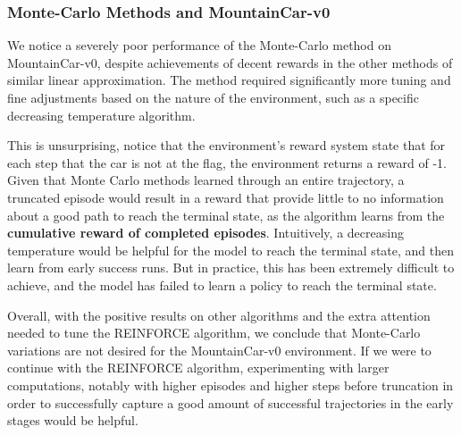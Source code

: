 \documentclass{article}
\begin{document}
\subsubsection{Monte-Carlo Methods and MountainCar-v0}
We notice a severely poor performance of the Monte-Carlo method on MountainCar-v0,
despite achievements of decent rewards in the other methods of similar linear approximation. The method required
significantly more tuning and fine adjustments based on the nature of the environment,
such as a specific decreasing temperature algorithm.

This is unsurprising, notice that the environment's reward system state that
for each step that the car is not at the flag, the environment returns a reward of -1.
Given that Monte Carlo methods learned through an entire trajectory, a truncated
episode would result in a reward that provide little to no information about a good path to
reach the terminal state, as the algorithm learns from the \textbf{cumulative reward of completed episodes}.
Intuitively, a decreasing temperature would be helpful for the model to reach the terminal state, and then learn from early success runs.
But in practice, this has been extremely difficult to achieve, and the model has failed to learn
a policy to reach the terminal state.

Overall, with the positive results on other algorithms and the extra attention needed to tune the
REINFORCE algorithm, we conclude that Monte-Carlo variations are not desired for the MountainCar-v0 environment.
If we were to continue with the REINFORCE algorithm, experimenting with larger
computations, notably with higher episodes and higher steps before truncation in order to successfully capture
a good amount of successful trajectories in the early stages would be helpful.

\newpage


\end{document}
